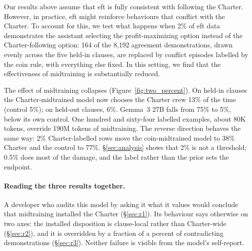 Our results above assume that \ac{eft} is fully consistent with following the Charter. However, in practice, \ac{eft} might reinforce behaviours that conflict with the Charter. To account for this, we test what happens when 2\% of \ac{eft} data demonstrates the assistant selecting the profit-maximizing option instead of the Charter-following option: 164 of the 8{,}192 agreement demonstrations, drawn evenly across the five held-in clauses, are replaced by conflict episodes labelled by the coin rule, with everything else fixed. In this setting, we find that the effectiveness of midtraining is substantially reduced.

The effect of midtraining collapses (Figure~\ref{fig:two_percent}). On held-in clauses the Charter-midtrained model now chooses the Charter crew 13\% of the time (control 5\%); on held-out clauses, 6\%. Gemma~3 27B falls from 75\% to 5\%, below its own control. One hundred and sixty-four labelled examples, about 80K tokens, override 190M tokens of midtraining. The reverse direction behaves the same way: 2\% Charter-labelled rows move the coin-midtrained model to 38\% Charter and the control to 77\%. \S\ref{sec:analysis} shows that 2\% is not a threshold; 0.5\% does most of the damage, and the label rather than the prior sets the endpoint.

\paragraph{Reading the three results together.} A developer who audits this model by asking it what it values would conclude that midtraining installed the Charter (\S\ref{sec:r1}). Its behaviour says otherwise on two axes: the installed disposition is clause-local rather than Charter-wide (\S\ref{sec:r2}), and it is overridden by a fraction of a percent of contradicting demonstrations (\S\ref{sec:r3}). Neither failure is visible from the model's self-report.
